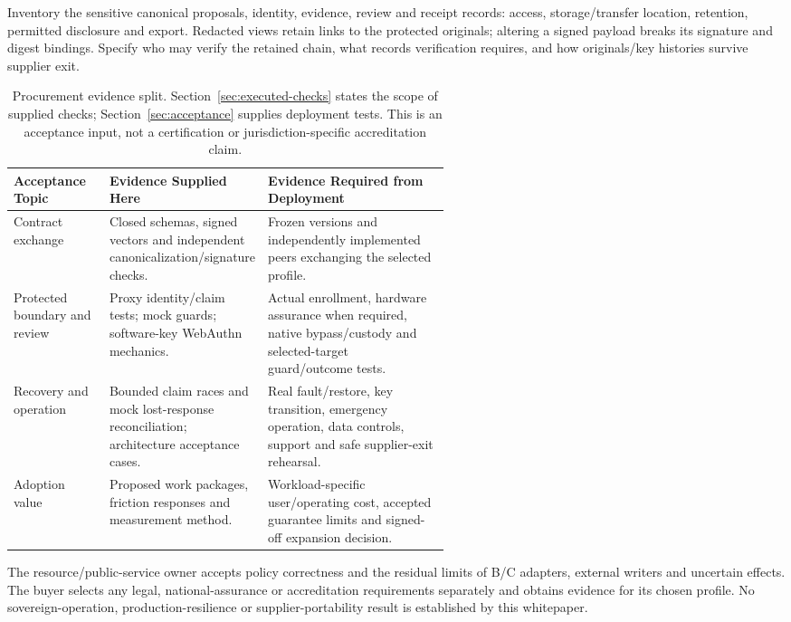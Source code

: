 Inventory the sensitive canonical proposals, identity, evidence, review and
receipt records: access, storage/transfer location, retention, permitted
disclosure and export. Redacted views retain links to the protected originals;
altering a signed payload breaks its signature and digest bindings. Specify
who may verify the retained chain, what records verification requires, and how
originals/key histories survive supplier exit.

\small
\begin{table}[!ht]
\begin{tabularx}{\linewidth}{@{}L{0.22\linewidth}L{0.34\linewidth}X@{}}
\toprule
\textbf{Acceptance Topic} & \textbf{Evidence Supplied Here} & \textbf{Evidence Required from Deployment}\\
\midrule
Contract exchange & Closed schemas, signed vectors and independent canonicalization/signature checks. & Frozen versions and independently implemented peers exchanging the selected profile.\\
Protected boundary and review & Proxy identity/claim tests; mock guards; software-key WebAuthn mechanics. & Actual enrollment, hardware assurance when required, native bypass/custody and selected-target guard/outcome tests.\\
Recovery and operation & Bounded claim races and mock lost-response reconciliation; architecture acceptance cases. & Real fault/restore, key transition, emergency operation, data controls, support and safe supplier-exit rehearsal.\\
Adoption value & Proposed work packages, friction responses and measurement method. & Workload-specific user/operating cost, accepted guarantee limits and signed-off expansion decision.\\
\bottomrule
\end{tabularx}
\caption{Procurement evidence split. Section~\ref{sec:executed-checks} states the
scope of supplied checks; Section~\ref{sec:acceptance} supplies deployment tests.
This is an acceptance input, not a certification or jurisdiction-specific
accreditation claim.}
\label{tab:buyer-evidence}
\end{table}
\normalsize

The resource/public-service owner accepts policy correctness and the residual
limits of B/C adapters, external writers and uncertain effects. The buyer
selects any legal, national-assurance or accreditation requirements separately
and obtains evidence for its chosen profile. No sovereign-operation,
production-resilience or supplier-portability result is established by this
whitepaper.
